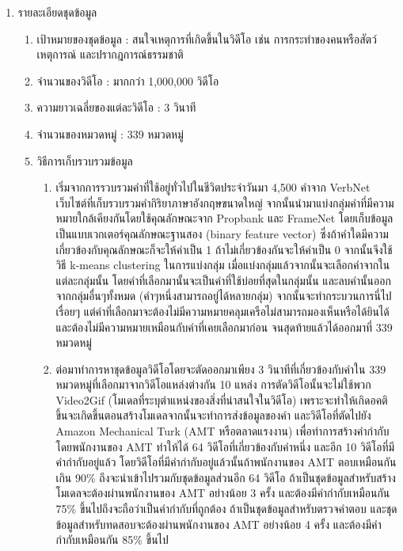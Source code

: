 \begin{enumerate}
	\item {รายละเอียดชุดข้อมูล}
	\begin{enumerate}
		\setlength\itemsep{-0.25em}
		\item เป้าหมายของชุดข้อมูล : สนใจเหตุการที่เกิดขึ้นในวิดีโอ เช่น การกระทำของคนหรือสัตว์ เหตุการณ์ และปรากฎการณ์ธรรมชาติ 
		\item จำนวนของวิดีโอ : มากกว่า 1,000,000 วิดีโอ
		\item ความยาวเฉลี่ยของแต่ละวิดีโอ : 3 วินาที
		\item จำนวนของหมวดหมู่ : 339 หมวดหมู่
		\item วิธีการเก็บรวบรวมข้อมูล
	\begin{enumerate}
		\item เริ่มจากการรวบรวมคำที่ใช้อยู่ทั่วไปในชีวิตประจำวันมา 4,500 คำจาก VerbNet\textsuperscript{\cite{Schuler:2005:VBC:1104493}} เว็บไซต์ที่เก็บรวบรวมคำกิริยาภาษาอังกฤษขนาดใหญ่ 
		จากนั้นนำมาแบ่งกลุ่มคำที่มีความหมายใกล้เคียงกันโดยใช้คุณลักษณะจาก Propbank\textsuperscript{\cite{Zaghouani:2010:RAP:1868720.1868756}} และ
		FrameNet\textsuperscript{\cite{Baker:1998:BFP:980451.980860}} โดยเก็บข้อมูลเป็นแบบเวกเตอร์คุณลักษณะฐานสอง (binary feature vector) 
		ซึ่งถ้าคำใดมีความเกี่ยวข้องกับคุณลักษณะก็จะให้ค่าเป็น 1 ถ้าไม่เกี่ยวข้องกันจะให้ค่าเป็น 0 จากนั้นจึงใช้วิธี k-means clustering ในการแบ่งกลุ่ม 
		เมื่อแบ่งกลุ่มแล้วจากนั้นจะเลือกคำจากในแต่ละกลุ่มนั้น โดยคำที่เลือกมานั้นจะเป็นคำที่ใช้บ่อยที่สุดในกลุ่มนั้น และลบคำนั้นออกจากกลุ่มอื่นๆทั้งหมด (คำๆหนึ่งสามารถอยู่ได้หลายกลุ่ม) 
		จากนั้นจะทำกระบวนการนี่ไปเรื่อยๆ แต่คำที่เลือกมาจะต้องไม่มีความหมายคลุมเครือไม่สามารถมองเห็นหรือได้ยินได้ และต้องไม่มีความหมายเหมือนกับคำที่เคยเลือกมาก่อน 
		จนสุดท้ายแล้วได้ออกมาที่ 339 หมวดหมู่
		\item ต่อมาทำการหาชุดข้อมูลวิดีโอโดยจะตัดออกมาเพียง 3 วินาทีที่เกี่ยวข้องกับคำใน 339 หมวดหมู่ที่เลือกมาจากวิดีโอแหล่งต่างกัน 10 แหล่ง 
		การตัดวิดีโอนั้นจะไม่ใช้พวก Video2Gif (โมเดลที่ระบุตำแหน่งของสิ่งที่น่าสนใจในวิดีโอ) เพราะจะทำให้เกิดอคติขึ้นจะเกิดขึ้นตอนสร้างโมเดลจากนั้นจะทำการส่งข้อมูลของคำ
		และวิดีโอที่ตัดไปยัง Amazon Mechanical Turk (AMT หรือตลาดแรงงาน) เพื่อทำการสร้างคำกำกับโดยพนักงานของ AMT ทำให้ได้ 64 วิดีโอที่เกี่ยวข้องกับคำหนึ่ง 
		และอีก 10 วิดีโอที่มีคำกำกับอยู่แล้ว โดยวิดีโอที่มีคำกำกับอยู่แล้วนั้นถ้าพนักงานของ AMT ตอบเหมือนกันเกิน 90\% ถึงจะนำเข้าไปรวมกับชุดข้อมูลส่วนอีก 64 วิดีโอ
		ถ้าเป็นชุดข้อมูลสำหรับสร้างโมเดลจะต้องผ่านพนักงานของ AMT อย่างน้อย 3 ครั้ง และต้องมีคำกำกับเหมือนกัน 75\% ขึ้นไปถึงจะถือว่าเป็นคำกำกับที่ถูกต้อง 
		ถ้าเป็นชุดข้อมูลสำหรับตรวจคำตอบ และชุดข้อมูลสำหรับทดสอบจะต้องผ่านพนักงานของ AMT อย่างน้อย 4 ครั้ง และต้องมีคำกำกับเหมือนกัน 85\% ขึ้นไป 

\end{enumerate}
\end{enumerate}
\end{enumerate}
